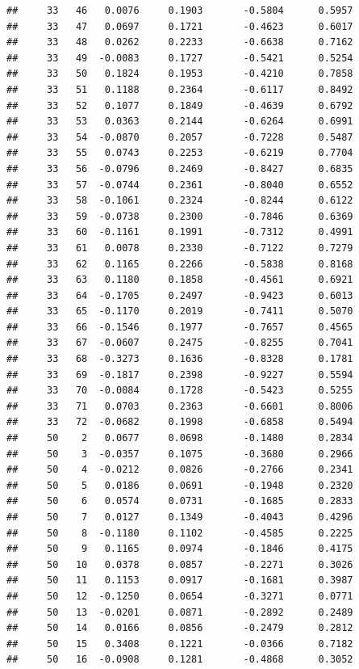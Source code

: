 \documentclass[
]{article}
\begin{document}
\begin{verbatim}
##     33   46   0.0076     0.1903       -0.5804      0.5957  
##     33   47   0.0697     0.1721       -0.4623      0.6017  
##     33   48   0.0262     0.2233       -0.6638      0.7162  
##     33   49  -0.0083     0.1727       -0.5421      0.5254  
##     33   50   0.1824     0.1953       -0.4210      0.7858  
##     33   51   0.1188     0.2364       -0.6117      0.8492  
##     33   52   0.1077     0.1849       -0.4639      0.6792  
##     33   53   0.0363     0.2144       -0.6264      0.6991  
##     33   54  -0.0870     0.2057       -0.7228      0.5487  
##     33   55   0.0743     0.2253       -0.6219      0.7704  
##     33   56  -0.0796     0.2469       -0.8427      0.6835  
##     33   57  -0.0744     0.2361       -0.8040      0.6552  
##     33   58  -0.1061     0.2324       -0.8244      0.6122  
##     33   59  -0.0738     0.2300       -0.7846      0.6369  
##     33   60  -0.1161     0.1991       -0.7312      0.4991  
##     33   61   0.0078     0.2330       -0.7122      0.7279  
##     33   62   0.1165     0.2266       -0.5838      0.8168  
##     33   63   0.1180     0.1858       -0.4561      0.6921  
##     33   64  -0.1705     0.2497       -0.9423      0.6013  
##     33   65  -0.1170     0.2019       -0.7411      0.5070  
##     33   66  -0.1546     0.1977       -0.7657      0.4565  
##     33   67  -0.0607     0.2475       -0.8255      0.7041  
##     33   68  -0.3273     0.1636       -0.8328      0.1781  
##     33   69  -0.1817     0.2398       -0.9227      0.5594  
##     33   70  -0.0084     0.1728       -0.5423      0.5255  
##     33   71   0.0703     0.2363       -0.6601      0.8006  
##     33   72  -0.0682     0.1998       -0.6858      0.5494  
##     50    2   0.0677     0.0698       -0.1480      0.2834  
##     50    3  -0.0357     0.1075       -0.3680      0.2966  
##     50    4  -0.0212     0.0826       -0.2766      0.2341  
##     50    5   0.0186     0.0691       -0.1948      0.2320  
##     50    6   0.0574     0.0731       -0.1685      0.2833  
##     50    7   0.0127     0.1349       -0.4043      0.4296  
##     50    8  -0.1180     0.1102       -0.4585      0.2225  
##     50    9   0.1165     0.0974       -0.1846      0.4175  
##     50   10   0.0378     0.0857       -0.2271      0.3026  
##     50   11   0.1153     0.0917       -0.1681      0.3987  
##     50   12  -0.1250     0.0654       -0.3271      0.0771  
##     50   13  -0.0201     0.0871       -0.2892      0.2489  
##     50   14   0.0166     0.0856       -0.2479      0.2812  
##     50   15   0.3408     0.1221       -0.0366      0.7182  
##     50   16  -0.0908     0.1281       -0.4868      0.3052  

\end{verbatim}
\end{document}
